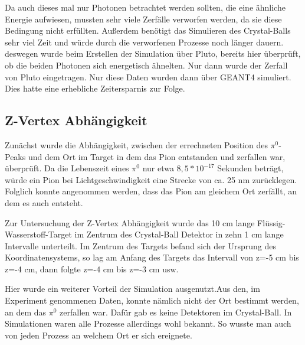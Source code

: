 \documentclass[a4paper,11pt,oneside,final,german,openbib,pdftex]{scrbook}
\begin{document}
{ Da auch dieses mal nur Photonen betrachtet werden sollten, die eine \"ahnliche Energie aufwiesen, mussten sehr viele Zerf\"alle verworfen werden, da sie diese Bedingung nicht erf\"ullten. Au{\ss}erdem ben\"otigt das Simulieren des Crystal-Balls sehr viel Zeit und w\"urde durch die verworfenen Prozesse noch l\"anger dauern. deswegen wurde beim Erstellen der Simulation \"uber Pluto, bereits hier \"uberpr\"uft, ob die beiden Photonen sich energetisch \"ahnelten. Nur dann wurde der Zerfall von Pluto eingetragen. Nur diese Daten wurden dann \"uber GEANT4 simuliert. Dies hatte eine erhebliche Zeitersparnis zur Folge.



\subsection{Z-Vertex Abh\"angigkeit}

Zun\"achst wurde die Abh\"angigkeit, zwischen der errechneten  Position des $\pi^0$-Peaks und dem Ort im Target in dem das Pion entstanden und zerfallen war, \"uberpr\"uft. Da die Lebenszeit eines $\pi^0$ nur etwa $8,5*10^{-17}$ Sekunden betr\"agt, w\"urde ein Pion bei Lichtgeschwindigkeit eine Strecke von ca. 25 nm zur\"ucklegen. Folglich konnte angenommen werden, dass das Pion am gleichem Ort zerf\"allt, an dem es auch entsteht.

 
Zur Untersuchung der Z-Vertex Abhängigkeit wurde das 10 cm lange Fl\"ussig-Wasserstoff-Target im Zentrum des Crystal-Ball Detektor in zehn 1 cm lange Intervalle unterteilt. Im Zentrum des Targets befand sich der Ursprung des Koordinatensystems, so lag am Anfang des Targets das Intervall von z=-5 cm bis z=-4 cm, dann folgte z=-4 cm bis z=-3 cm usw. 

Hier wurde ein weiterer Vorteil der Simulation ausgenutzt.Aus den, im Experiment genommenen Daten, konnte n\"amlich nicht der Ort bestimmt werden, an dem das $\pi^0$ zerfallen war. Daf\"ur gab es keine Detektoren im Crystal-Ball. In Simulationen waren alle Prozesse allerdings wohl bekannt. So wusste man auch von jeden Prozess an welchem Ort er sich ereignete. 

}
\end{document}
